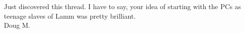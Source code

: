 Just discovered this thread.  I have to say, your idea of starting with the PCs as teenage slaves of Lamm was pretty brilliant.\\

Doug M.\\

